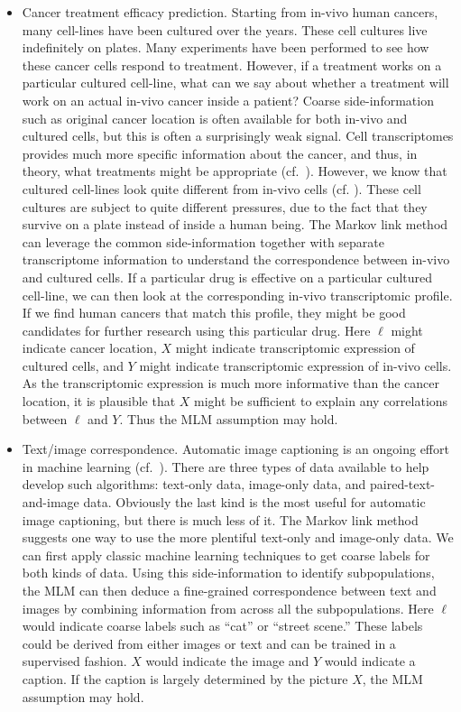 \begin{itemize}
    \item Cancer treatment efficacy prediction.  Starting from in-vivo human cancers, many cell-lines have been cultured over the years.  These cell cultures live indefinitely on plates.  Many experiments have been performed to see how these cancer cells respond to treatment.  However, if a treatment works on a particular cultured cell-line, what can we say about whether a treatment will work on an actual in-vivo cancer inside a patient?  Coarse side-information such as original cancer location is often available for both in-vivo and cultured cells, but this is often a surprisingly weak signal.  Cell transcriptomes provides much more specific information about the cancer, and thus, in theory, what treatments might be appropriate (cf.\ \cite{cieslik2018cancer}).  However, we know that cultured cell-lines look quite different from in-vivo cells (cf. \cite{imamura2015comparison,haibe2013inconsistency}).   These cell cultures are subject to quite different pressures, due to the fact that they survive on a plate instead of inside a human being.  The Markov link method can leverage the common side-information together with separate transcriptome information to understand the correspondence between in-vivo and cultured cells.  If a particular drug is effective on a particular cultured cell-line, we can then look at the corresponding in-vivo transcriptomic profile.  If we find human cancers that match this profile, they might be good candidates for further research using this particular drug.  Here $\ell$ might indicate cancer location, $X$ might indicate transcriptomic expression of cultured cells, and $Y$ might indicate transcriptomic expression of in-vivo cells.  As the transcriptomic expression is much more informative than the cancer location, it is plausible that $X$ might be sufficient to explain any correlations between $\ell$ and $Y$.  Thus the MLM assumption may hold.

    \item Text/image correspondence.  Automatic image captioning is an ongoing effort in machine learning (cf.\ \cite{srivastava2018survey}).  There are three types of data available to help develop such algorithms: text-only data, image-only data, and paired-text-and-image data.  Obviously the last kind is the most useful for automatic image captioning, but there is much less of it.  The Markov link method suggests one way to use the more plentiful text-only and image-only data.  We can first apply classic machine learning techniques to get coarse labels for both kinds of data.  Using this side-information to identify subpopulations, the MLM can then deduce a fine-grained correspondence between text and images by combining information from across all the subpopulations.  Here $\ell$ would indicate coarse labels such as ``cat'' or ``street scene.''  These labels could be derived from either images or text and can be trained in a supervised fashion.  $X$ would indicate the image and $Y$ would indicate a caption.  If the caption is largely determined by the picture $X$, the MLM assumption may hold.  


\end{itemize}
